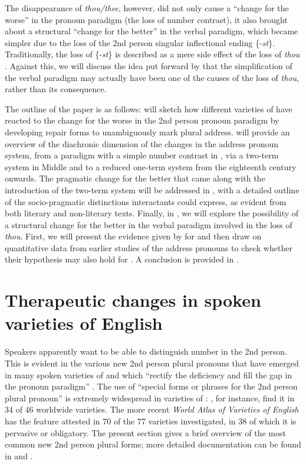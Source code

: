 \documentclass[output=paper,hidelinks]{langscibook}
\begin{document}
The disappearance of \textit{thou/thee}, however, did not only cause a \enquote{change for the worse} in the pronoun paradigm (the loss of number contrast), it also brought about a structural \enquote{change for the better} in the verbal paradigm, which became simpler due to the loss of the 2nd person singular inflectional ending \{-\textit{st}\}. Traditionally, the loss of \{-\textit{st}\} is described as a mere side effect of the loss of \textit{thou} \citep[e.g.][162]{Lass1999}. Against this, we will discuss the idea put forward by \citet{Aalberse2015} that the simplification of the verbal paradigm may actually have been one of the causes of the loss of \textit{thou}, rather than its consequence. 

The outline of the paper is as follows:  will sketch how different varieties of  have reacted to the change for the worse in the 2nd person pronoun paradigm by developing repair forms to unambiguously mark plural address.  will provide an overview of the diachronic dimension of the changes in the address pronoun system, from a paradigm with a simple number contrast in , via a two-term system in Middle and  to a reduced one-term system from the eighteenth century onwards. The pragmatic change for the better that came along with the introduction of the two-term system will be addressed in , with a detailed outline of the socio-pragmatic distinctions interactants could express, as evident from both literary and non-literary texts. Finally, in , we will explore the possibility of a structural change for the better in the verbal paradigm involved in the loss of \textit{thou}. First, we will present the evidence given by \citet{Aalberse2015} for  and then draw on quantitative data from earlier studies of the  address pronouns to check whether their hypothesis may also hold for . A conclusion is provided in .

\section{Therapeutic changes in spoken varieties of English}\label{sec:eh:2}

Speakers apparently want to be able to distinguish number in the 2nd person. This is evident in the various new 2nd person plural pronouns that have emerged in many spoken varieties of  and which \enquote{rectify the deficiency and fill the gap in the pronoun paradigm} \citep[345]{Hickey2003}. The use of \enquote{special forms or phrases for the 2nd person plural pronoun} is extremely widespread in varieties of : \citet[1154]{Kortmann2004}, for instance, find it in 34 of 46 worldwide varieties. The more recent \textit{World Atlas of Varieties of English} \citep{Kortmannetal2020} has the feature attested in 70 of the 77 varieties investigated, in 38 of which it is pervasive or obligatory. The present section gives a brief overview of the most common new 2nd person plural forms; more detailed documentation can be found in \citet{Wright1997} and \citet{Hickey2003}.
\end{document}
